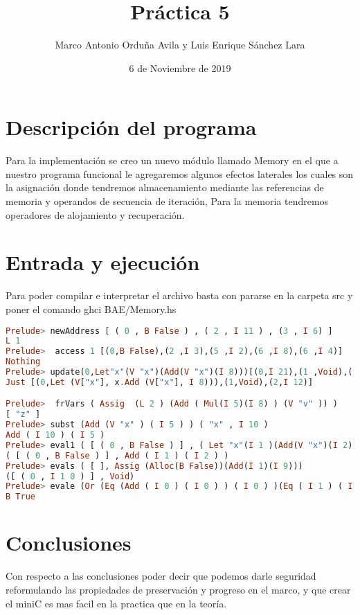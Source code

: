 \documentclass{article}
\title{ Práctica 5}
\author{Marco Antonio Orduña Avila y Luis Enrique Sánchez Lara}
\affil{Facultad de Ciencias, UNAM}
\date{6 de Noviembre de 2019}
\begin{document}
\maketitle

\section{Descripción del programa}

Para la implementación se creo un nuevo módulo llamado Memory en el que a nuestro programa funcional le agregaremos algunos efectos laterales los cuales son la asignación donde tendremos almacenamiento mediante las referencias de memoria y operandos de secuencia de iteración, Para la memoria tendremos operadores de alojamiento y recuperación.
 
\section{Entrada y ejecución}

Para poder compilar e interpretar el archivo basta con pararse en la carpeta src y poner el comando ghci BAE/Memory.hs

\begin{lstlisting}[language=Haskell]
Prelude> newAddress [ ( 0 , B False ) , ( 2 , I 11 ) , (3 , I 6) ]
L 1
Prelude>  access 1 [(0,B False),(2 ,I 3),(5 ,I 2),(6 ,I 8),(6 ,I 4)]
Nothing 
Prelude> update(0,Let"x"(V "x")(Add(V "x")(I 8)))[(0,I 21),(1 ,Void),( 2, I 12)]
Just [(0,Let (V["x"], x.Add (V["x"], I 8))),(1,Void),(2,I 12)]

Prelude>  frVars ( Assig  (L 2 ) (Add ( Mul(I 5)(I 8) ) (V "v" )) )
[ "z" ]
Prelude> subst (Add (V "x" ) ( I 5 ) ) ( "x" , I 10 )
Add ( I 10 ) ( I 5 )
Prelude> eval1 ( [ ( 0 , B False ) ] , ( Let "x"(I 1 )(Add(V "x")(I 2))))
( [ ( 0 , B False ) ] , Add ( I 1 ) ( I 2 ) )
Prelude> evals ( [ ], Assig (Alloc(B False))(Add(I 1)(I 9)))
([ ( 0 , I 1 0 ) ] , Void)
Prelude> evale (Or (Eq (Add ( I 0 ) ( I 0 ) ) ( I 0 ) )(Eq ( I 1 ) ( I 10 )))
B True

\end{lstlisting}

\section{Conclusiones}

Con respecto a las conclusiones poder decir que podemos darle seguridad reformulando las propiedades de preservación y progreso en el marco, y que crear el miniC es mas facil en la practica que en la teoría. 
\end{document}

